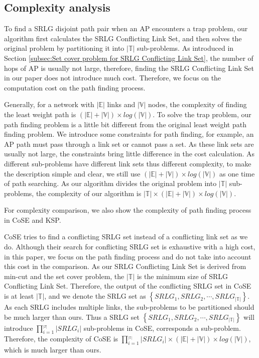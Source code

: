 \subsection{Complexity analysis}
To find a SRLG disjoint path pair when an AP encounters a trap problem, our algorithm first calculates the SRLG Conflicting Link Set, and then solves the original problem by partitioning it into $|\mathbb{T}|$ sub-problems. As introduced in Section \ref{subsec:Set cover problem for SRLG Conflicting Link Set},  the number of hops of AP is usually not large, therefore, finding the SRLG Conflicting Link Set in our paper does not introduce much cost. Therefore, we focus on the computation cost on the path finding process.

Generally, for a network with $|\mathbb{E}|$ links and $|\mathbb{V}|$ nodes, the complexity of finding the least weight path is $(|\mathbb{E}|+|\mathbb{V}|)\times log(|\mathbb{V}|)$. To solve the trap problem, our path finding problem is a little bit different from the original least weight path finding problem. We introduce some constraints for path finding, for example, an AP path must pass through a link set or cannot pass a set. As these link sets are usually not large, the constraints bring little  difference in the cost calculation. As different sub-problems have different link sets thus different complexity, to make the description simple and clear, we still use $(|\mathbb{E}|+|\mathbb{V}|)\times log(|\mathbb{V}|)$ as one time of path searching. As our algorithm divides the original problem into $|\mathbb{T}|$ sub-problems, the complexity of our algorithm is $|\mathbb{T}|\times(|\mathbb{E}|+|\mathbb{V}|)\times log(|\mathbb{V}|)$.

For complexity comparison, we also show the complexity of path finding process in  CoSE\cite{rostami2007cose} and KSP\cite{eppstein1998finding}.

CoSE tries to find a conflicting SRLG set instead of a conflicting link set as we do. Although their search for conflicting SRLG set is exhaustive with a high cost, in this paper, we focus on the path finding process and do not take into account this cost in the comparison. As our SRLG Conflicting Link Set is derived from min-cut and the set cover problem, the $|\mathbb{T}|$ is the minimum size of SRLG Conflicting Link Set. Therefore, the output of the conflicting SRLG set in CoSE is at least $|\mathbb{T}|$, and we denote the SRLG set as $\left\{ {SRL{G_1},SRL{G_2}, \cdots ,SRL{G_{|\mathbb{T}|}}} \right\}$. As each SRLG  includes multiple links, the sub-problems to be partitioned should be much larger than ours.  Thus a SRLG set $\left\{ {SRL{G_1},SRL{G_2}, \cdots ,SRL{G_{|\mathbb{T}|}}} \right\}$ will introduce $\prod\limits_{i = 1}^{_{\left| T \right|}} {\left| {SRL{G_i}} \right|}$ sub-problems in CoSE,  corresponds  a sub-problem. Therefore, the complexity of CoSE  is $\prod\limits_{i = 1}^{_{|\mathbb{T}|}} {\left| {SRL{G_i}} \right|}\times (|\mathbb{E}|+|\mathbb{V}|)\times log(|\mathbb{V}|)$, which is much larger than ours.

